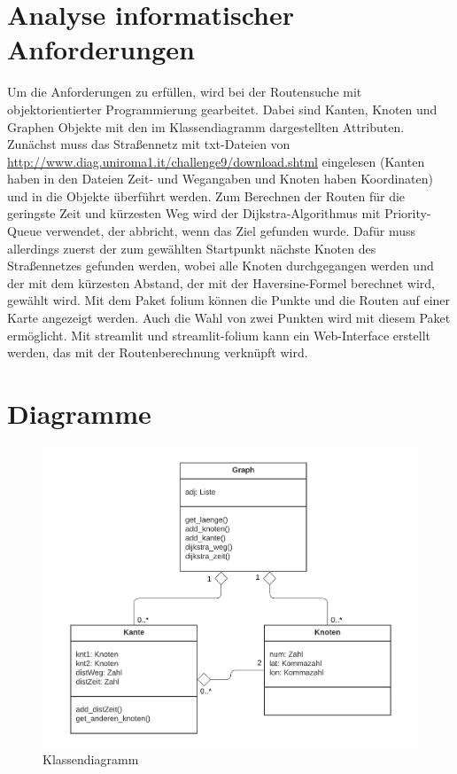 \documentclass[a4paper,12pt,ngerman]{scrartcl}
\begin{document}
\section{Analyse informatischer Anforderungen}
Um die Anforderungen zu erfüllen, wird bei der Routensuche mit objektorientierter Programmierung gearbeitet. Dabei sind Kanten, Knoten und Graphen Objekte mit den im Klassendiagramm dargestellten Attributen. Zunächst muss das Straßennetz mit txt-Dateien von \url{http://www.diag.uniroma1.it/challenge9/download.shtml} eingelesen (Kanten haben in den Dateien Zeit- und Wegangaben und Knoten haben Koordinaten) und in die Objekte überführt werden. Zum Berechnen der Routen für die geringste Zeit und kürzesten Weg wird der Dijkstra-Algorithmus mit Priority-Queue verwendet, der abbricht, wenn das Ziel gefunden wurde. Dafür muss allerdings zuerst der zum gewählten Startpunkt nächste Knoten des Straßennetzes gefunden werden, wobei alle Knoten durchgegangen werden und der mit dem kürzesten Abstand, der mit der Haversine-Formel berechnet wird, gewählt wird. Mit dem Paket folium können die Punkte und die Routen auf einer Karte angezeigt werden. Auch die Wahl von zwei Punkten wird mit diesem Paket ermöglicht. Mit streamlit und streamlit-folium kann ein Web-Interface erstellt werden, das mit der Routenberechnung verknüpft wird.

\newpage
\section{Diagramme}
\begin{figure}[!ht]
  \center
  \includegraphics[width=\textwidth]{Klassendiagramm.png}
  \vspace{-.5cm}
  \caption{Klassendiagramm}
\end{figure}
\end{document}
